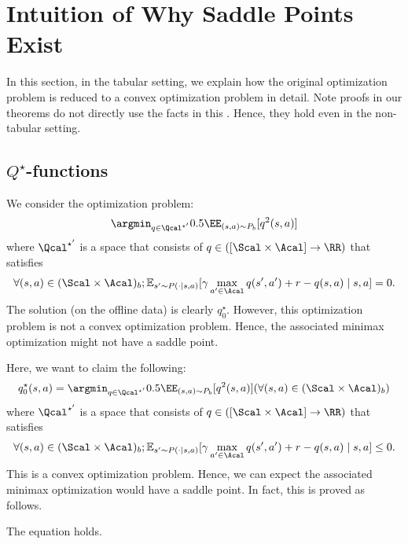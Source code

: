 



\section{Intuition of Why Saddle Points Exist}\label{sec:intuition}

In this section, in the tabular setting, we explain how the original optimization problem is reduced to a convex optimization problem in detail. Note proofs in our theorems do not directly use the facts in this . Hence, they hold even in the non-tabular setting. 


\subsection{$Q^{\star}$-functions }

We consider the optimization problem: 
\begin{align*}
    \argmin_{q\in \Qcal^{\star '}}0.5\EE_{(s,a)\sim P_b}[q^2(s,a)]
\end{align*}
where $\Qcal^{\star '}$ is a space that consists of $q\in ([\Scal \times \Acal]\to \RR)$ that satisfies
\begin{align*}
    \forall (s,a)\in (\Scal \times \Acal)_b; \mathbb{E}_{s'\sim P(\cdot \mid s,a)}[\gamma \max_{a'\in \Acal} q(s',a')+r-q(s,a)\mid s,a]=0. 
\end{align*}
The solution (on the offline data) is clearly $q^{\star}_{0}$. However, this optimization problem is not a convex optimization problem. Hence, the associated minimax optimization might not have a saddle point. 

Here, we want to claim the following:
\begin{align}\label{eq:convex}
    q^{\star}_{0}(s,a) = \argmin_{q\in \Qcal^{\star '}}0.5\EE_{(s,a)\sim P_b}[q^2(s,a)] (\forall (s,a)\in (\Scal\times \Acal)_b)
\end{align}
where $\Qcal^{\star '}$ is a space that consists of $q\in ([\Scal \times \Acal]\to \RR)$ that satisfies
\begin{align*}
    \forall (s,a)\in (\Scal \times \Acal)_b; \mathbb{E}_{s'\sim P(\cdot \mid s,a)}[\gamma \max_{a'\in \Acal} q(s',a')+r-q(s,a)\mid s,a]\leq 0. 
\end{align*}
This is a convex optimization problem. Hence, we can expect the associated minimax optimization would have a saddle point. In fact, this is proved as follows. 

\begin{lemma}
The equation  holds. 
\end{lemma}

